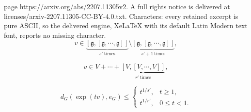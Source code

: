 \documentclass[10pt,a4paper]{amsart}
\begin{document}
page https://arxiv.org/abs/2207.11305v2. A full rights notice is delivered at licenses/arxiv-2207.11305-CC-BY-4.0.txt. Characters: every retained excerpt is pure ASCII, so the delivered engine, XeLaTeX with its default Latin Modern text font, reports no missing character.
\begin{equation}\label{eq:global-degree}
v\in \underbrace{\left[\mathfrak{g},\left[\mathfrak{g},\cdots,\mathfrak{g}\right]\right]}_{s'\mathrm{~times}}\setminus \underbrace{\left[\mathfrak{g},\left[\mathfrak{g},\cdots,\mathfrak{g}\right]\right]}_{s'+1\mathrm{~times}},
\end{equation}

\begin{equation}\label{eq:local-degree}
v\in V+\cdots+\underbrace{\left[V,\left[V,\cdots,V\right]\right]}_{r'\mathrm{~times}},
\end{equation}

\begin{equation}\label{eq:sharpDistIneq}
d_G\left(\exp\left(tv\right),e_G\right)\le \begin{cases}
t^{1/s'},&t\ge 1,\\
t^{1/r'},&0\le t<1.
\end{cases}
\end{equation}
\end{document}
